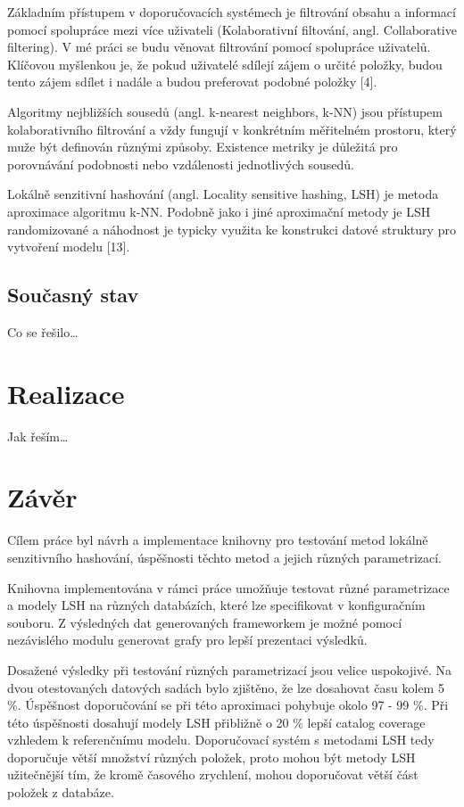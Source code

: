 \documentclass[11pt]{article}
\begin{document}
Základním přístupem v doporučovacích systémech je filtrování obsahu a informací pomocí spolupráce mezi více uživateli (Kolaborativní filtování, angl. Collaborative filtering). V mé práci se budu věnovat filtrování pomocí spolupráce uživatelů. Klíčovou myšlenkou je, že pokud uživatelé sdílejí zájem o určité položky, budou tento zájem sdílet i nadále a budou preferovat podobné položky [4].

Algoritmy nejbližších sousedů (angl. k-nearest neighbors, k-NN) jsou přístupem kolaborativního filtrování a vždy fungují v konkrétním měřitelném prostoru, který muže být definován různými způsoby. Existence metriky je důležitá pro porovnávání podobnosti nebo vzdálenosti jednotlivých sousedů.

Lokálně senzitivní hashování (angl. Locality sensitive hashing, LSH) je metoda aproximace algoritmu k-NN. Podobně jako i jiné aproximační metody je LSH randomizované a náhodnost je typicky využita ke konstrukci datové struktury pro vytvoření modelu [13].
\subsection{Současný stav}

Co se řešilo\dots 
\section{Realizace}
Jak řeším\dots
\section{Závěr}
Cílem práce byl návrh a implementace knihovny pro testování metod lokálně senzitivního hashování, úspěšnosti těchto metod a jejich různých parametrizací.
	
	Knihovna implementována v rámci práce umožňuje testovat různé parametrizace a modely LSH na různých databázích, které lze specifikovat v konfiguračním souboru. Z výsledných dat generovaných frameworkem je možné pomocí nezávislého modulu generovat grafy pro lepší prezentaci výsledků.
	
	Dosažené výsledky při testování různých parametrizací jsou velice uspokojivé. Na dvou otestovaných datových sadách bylo zjištěno, že lze dosahovat času kolem 5 \%. Úspěšnost doporučování se při této aproximaci pohybuje okolo 97 - 99 \%. Při této úspěšnosti dosahují modely LSH přibližně o 20 \% lepší catalog coverage vzhledem k referenčnímu modelu. Doporučovací systém s metodami LSH tedy doporučuje větší množství různých položek, proto mohou být metody LSH užitečnější tím, že kromě časového zrychlení, mohou doporučovat větší část položek z databáze.
	
\end{document}
